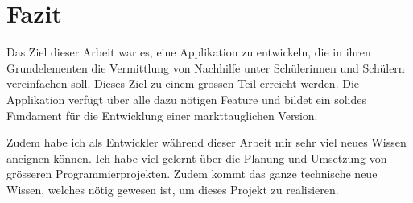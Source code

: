 \documentclass[a4paper,11pt]{report}
\begin{document}
		\section{Fazit}
		Das Ziel dieser Arbeit war es, eine Applikation zu entwickeln, die in ihren Grundelementen die Vermittlung von Nachhilfe unter Schülerinnen und Schülern vereinfachen soll. Dieses Ziel zu einem grossen Teil erreicht werden. Die Applikation verfügt über alle dazu nötigen Feature und bildet ein solides Fundament für die Entwicklung einer markttauglichen Version.
		
		Zudem habe ich als Entwickler während dieser Arbeit mir sehr viel neues Wissen aneignen können. Ich habe viel gelernt über die Planung und Umsetzung von grösseren Programmierprojekten. Zudem kommt das ganze technische neue Wissen, welches nötig gewesen ist, um dieses Projekt zu realisieren.
\newpage
\raggedright
	
	
\end{document}
